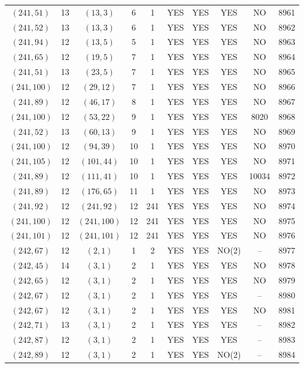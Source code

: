\begin{longtable}{|c|c|c|c|c|c|c|c|c|c|}
$(241, 51)$ & 13 & $(13, 3)$ & 6 & 1 & YES & YES & YES & NO & 8961\\
$(241, 52)$ & 13 & $(13, 3)$ & 6 & 1 & YES & YES & YES & NO & 8962\\
$(241, 94)$ & 12 & $(13, 5)$ & 5 & 1 & YES & YES & YES & NO & 8963\\
$(241, 65)$ & 12 & $(19, 5)$ & 7 & 1 & YES & YES & YES & NO & 8964\\
$(241, 51)$ & 13 & $(23, 5)$ & 7 & 1 & YES & YES & YES & NO & 8965\\
$(241, 100)$ & 12 & $(29, 12)$ & 7 & 1 & YES & YES & YES & NO & 8966\\
$(241, 89)$ & 12 & $(46, 17)$ & 8 & 1 & YES & YES & YES & NO & 8967\\
$(241, 100)$ & 12 & $(53, 22)$ & 9 & 1 & YES & YES & YES & 8020 & 8968\\
$(241, 52)$ & 13 & $(60, 13)$ & 9 & 1 & YES & YES & YES & NO & 8969\\
$(241, 100)$ & 12 & $(94, 39)$ & 10 & 1 & YES & YES & YES & NO & 8970\\
$(241, 105)$ & 12 & $(101, 44)$ & 10 & 1 & YES & YES & YES & NO & 8971\\
$(241, 89)$ & 12 & $(111, 41)$ & 10 & 1 & YES & YES & YES & 10034 & 8972\\
$(241, 89)$ & 12 & $(176, 65)$ & 11 & 1 & YES & YES & YES & NO & 8973\\
$(241, 92)$ & 12 & $(241, 92)$ & 12 & 241 & YES & YES & YES & NO & 8974\\
$(241, 100)$ & 12 & $(241, 100)$ & 12 & 241 & YES & YES & YES & NO & 8975\\
$(241, 101)$ & 12 & $(241, 101)$ & 12 & 241 & YES & YES & YES & NO & 8976\\
$(242, 67)$ & 12 & $(2, 1)$ & 1 & 2 & YES & YES & NO(2) & -- & 8977\\
$(242, 45)$ & 14 & $(3, 1)$ & 2 & 1 & YES & YES & YES & NO & 8978\\
$(242, 65)$ & 12 & $(3, 1)$ & 2 & 1 & YES & YES & YES & NO & 8979\\
$(242, 67)$ & 12 & $(3, 1)$ & 2 & 1 & YES & YES & YES & -- & 8980\\
$(242, 67)$ & 12 & $(3, 1)$ & 2 & 1 & YES & YES & YES & NO & 8981\\
$(242, 71)$ & 13 & $(3, 1)$ & 2 & 1 & YES & YES & YES & -- & 8982\\
$(242, 87)$ & 12 & $(3, 1)$ & 2 & 1 & YES & YES & YES & -- & 8983\\
$(242, 89)$ & 12 & $(3, 1)$ & 2 & 1 & YES & YES & NO(2) & -- & 8984\\

\end{longtable}
